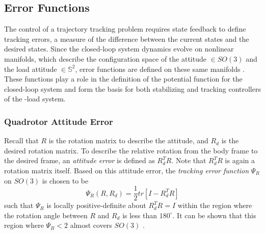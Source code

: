 \subsection{Error Functions}\label{sec:con.configerr}


%
The control of a trajectory tracking problem requires state feedback to define tracking errors, a measure of the difference between the current states and the desired states.
Since the closed-loop system dynamics evolve on nonlinear manifolds, which describe the configuration space of the  attitude $ \in SO(3) $ and the load attitude $ \in \mathbb{S}^2 $, 
error functions are defined on these same manifolds \cite{Bullo2005}. 
These functions play a role in the definition of the potential function for the closed-loop system and form the basis for both stabilizing and tracking controllers of the -load system.

\subsubsection*{Quadrotor Attitude Error}
Recall that $ R $ is the rotation matrix to describe the  attitude, and $ R_d $ is the desired rotation matrix. To describe the relative rotation from the body frame to the desired frame, an \textit{attitude error} is defined as $ R^T_dR $. Note that $ R^T_dR $ is again a rotation matrix itself.
Based on this attitude error, the \textit{tracking error function} $ \Psi_R $ on $ SO(3) $ is chosen to be 
\begin{equation}\label{eq:psiR}
\Psi_R(R,R_d)=\frac{1}{2}tr\left[I-R_d^TR\right]
\end{equation}
such that $ \Psi_R $ is locally positive-definite about $ R^T_dR=I $ within the region where the rotation angle between $ R $ and $ R_d $ is less than $ 180^\circ $. 
It can be shown that this region where $ \Psi_R<2 $ almost covers $ SO(3) $ \cite{Lee2010c}.\\

